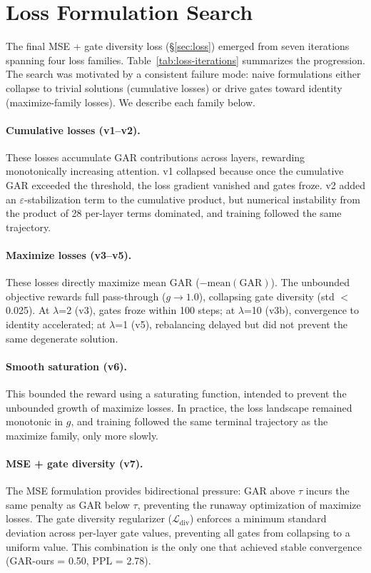 \section{Loss Formulation Search}\label{sec:appendix-loss}

The final MSE + gate diversity loss (\S\ref{sec:loss}) emerged from seven iterations spanning four loss families. Table~\ref{tab:loss-iterations} summarizes the progression. The search was motivated by a consistent failure mode: naive formulations either collapse to trivial solutions (cumulative losses) or drive gates toward identity (maximize-family losses). We describe each family below.

\paragraph{Cumulative losses (v1--v2).} These losses accumulate GAR contributions across layers, rewarding monotonically increasing attention. v1 collapsed because once the cumulative GAR exceeded the threshold, the loss gradient vanished and gates froze. v2 added an $\varepsilon$-stabilization term to the cumulative product, but numerical instability from the product of 28 per-layer terms dominated, and training followed the same trajectory.

\paragraph{Maximize losses (v3--v5).} These losses directly maximize mean GAR ($-\text{mean}(\text{GAR})$). The unbounded objective rewards full pass-through ($g \to 1.0$), collapsing gate diversity (std $<$ 0.025). At $\lambda$=2 (v3), gates froze within 100 steps; at $\lambda$=10 (v3b), convergence to identity accelerated; at $\lambda$=1 (v5), rebalancing delayed but did not prevent the same degenerate solution.

\paragraph{Smooth saturation (v6).} This bounded the reward using a saturating function, intended to prevent the unbounded growth of maximize losses. In practice, the loss landscape remained monotonic in $g$, and training followed the same terminal trajectory as the maximize family, only more slowly.

\paragraph{MSE + gate diversity (v7).} The MSE formulation provides bidirectional pressure: GAR above $\tau$ incurs the same penalty as GAR below $\tau$, preventing the runaway optimization of maximize losses. The gate diversity regularizer ($\mathcal{L}_\text{div}$) enforces a minimum standard deviation across per-layer gate values, preventing all gates from collapsing to a uniform value. This combination is the only one that achieved stable convergence (GAR-ours = 0.50, PPL = 2.78).


